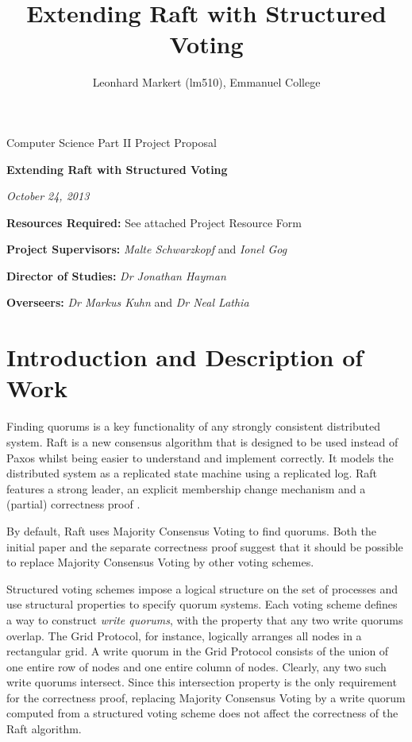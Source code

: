 \documentclass[12pt]{scrartcl}
\title{Extending Raft with Structured Voting}
\author{Leonhard Markert (lm510), Emmanuel College}
\begin{document}
\thispagestyle{empty}

 \medskip
{} \medskip
{}

\vfil

\centerline{\large Computer Science Part \textsc{II} Project Proposal} \vspace{0.4in}
\centerline{\Large\bf Extending Raft with Structured Voting} \vspace{0.3in}
\centerline{\large \emph{October 24, 2013}}

\vfil

{\bf Resources Required:} See attached Project Resource Form \vspace{0.5in}

{\bf Project Supervisors:} \emph{Malte Schwarzkopf} and \emph{Ionel Gog} \vspace{0.2in}

{\bf Director of Studies:}  \emph{Dr Jonathan Hayman} \vspace{0.2in}

{\bf Overseers:} \emph{Dr Markus Kuhn} and \emph{Dr Neal Lathia} \vspace{0.2in}

\newpage

\section{Introduction and Description of Work%
  \label{introduction-and-description-of-work}%
}

Finding quorums is a key functionality of any strongly consistent distributed system. Raft \cite{raft} is a new consensus algorithm that is designed to be used instead of Paxos \cite{paxos} whilst being easier to understand and implement correctly. It models the distributed system as a replicated state machine using a replicated log. Raft features a strong leader, an explicit membership change mechanism and a (partial) correctness proof \cite{proof}.

By default, Raft uses Majority Consensus Voting to find quorums. Both the initial paper and the separate correctness proof suggest that it should be possible to replace Majority Consensus Voting by other voting schemes.

Structured voting schemes \cite{voting} impose a logical structure on the set of processes and use structural properties to specify quorum systems. Each voting scheme defines a way to construct \emph{write quorums}, with the property that any two write quorums overlap. The Grid Protocol, for instance, logically arranges all nodes in a rectangular grid. A write quorum in the Grid Protocol consists of the union of one entire row of nodes and one entire column of nodes. Clearly, any two such write quorums intersect. Since this intersection property is the only requirement for the correctness proof, replacing Majority Consensus Voting by a write quorum computed from a structured voting scheme does not affect the correctness of the Raft algorithm.
\end{document}
